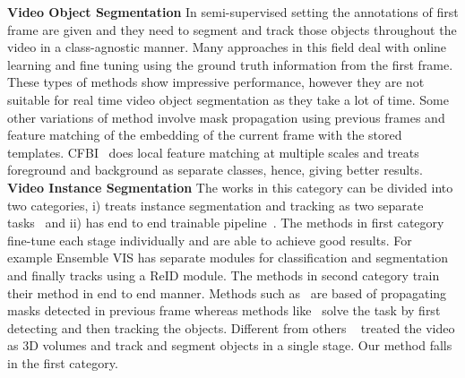 \documentclass[final]{cvpr}
\begin{document}
\noindent \textbf{Video Object Segmentation}
In semi-supervised setting the annotations of first frame are given and they need to segment and track those objects throughout the video in a class-agnostic manner.  Many approaches in this field deal with online learning and fine tuning \cite {luiten2018premvos, wang2019object, xu2019mhp} using the ground truth information from the first frame. These types of methods show impressive performance, however they are not suitable for real time video object segmentation as they take a lot of time. Some other variations of method involve mask propagation \cite {perazzi2017learning, li2018instance, oh2019video} using previous frames and feature matching \cite {voigtlaender2019feelvos, oh2018fast, yang2020collaborative, yang2020cfbi+} of the embedding of the current frame with the stored templates. CFBI~\cite{yang2020collaborative} does local feature matching at multiple scales and treats foreground and background as separate classes, hence, giving better results.\\

\noindent \textbf{Video Instance Segmentation} The works in this category can be divided into two categories, i) treats instance segmentation and tracking as two separate tasks~\cite{luiten2019video, wang2019empirical} and ii) has end to end trainable pipeline~\cite{bertasius2020classifying, cao2020sipmask, athar2020stem, lin2020video, yang2019video, lin2021video, fu2020compfeat, fu2021learning}. 
The methods in first category fine-tune each stage individually and are able to achieve good results. For example Ensemble VIS \cite{luiten2019video} has separate modules for classification and segmentation and finally tracks using a ReID module. The methods in second category train their method in end to end manner. Methods such as~\cite{bertasius2020classifying, lin2021video} are based of propagating masks detected in previous frame whereas methods like~\cite{yang2019video, cao2020sipmask, QueryInst} solve the task by first detecting and then tracking the objects. Different from others ~\cite{athar2020stem} treated the video as 3D volumes and track and segment objects in a single stage. Our method falls in the first category.
\end{document}
